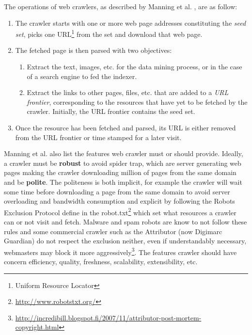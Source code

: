 \documentclass[11pt,a4paper]{article}
\begin{document}
The operations of web crawlers, as described by Manning et al. \cite[pp. 405-420]{man:info_ret}, are as follow:
\vspace{-15pt}\begin{enumerate}
\setlength{\itemsep}{0cm}%
\setlength{\parskip}{0cm}%
\item The crawler starts with one or more web page addresses constituting the \textit{seed set}, picks one URL\footnote{Uniform Resource Locator} from the set and download that web page.
\item The fetched page is then parsed with two objectives:
	\vspace{-5pt}\begin{enumerate}
	\setlength{\itemsep}{0cm}%
	\setlength{\parskip}{0cm}%
	\item Extract the text, images, etc. for the data mining process, or in the case of a search engine to fed the indexer.
	\item Extract the links to other pages, files, etc. that are added to a \textit{URL frontier}, corresponding to the resources that have yet to be fetched by the crawler. Initially, the URL frontier contains the seed set.
	\end{enumerate}\vspace{-4pt}
\item Once the resource has been fetched and parsed, its URL is either removed from the URL frontier or time stamped for a later visit.
\end{enumerate}
\vspace{-9pt}
Manning et al. \cite[pp. 405-420]{man:info_ret} also list the features web crawler must or should provide. Ideally, a crawler must be \textbf{robust} to avoid spider trap, which are server generating web pages making the crawler downloading million of pages from the same domain and be \textbf{polite}. The politeness is both implicit, for example the crawler will wait some time before downloading a page from the same domain to avoid server overloading and bandwidth consumption and explicit by following the Robots Exclusion Protocol define in the robot.txt\footnote{\url{http://www.robotstxt.org/}} which set what resources a crawler can or not visit and fetch. Malware and spam robots are know to not follow these rules and some commercial crawler such as the Attributor (now Digimarc Guardian) do not respect the exclusion neither, even if understandably necessary, webmasters may block it more aggressively\footnote{\url{http://incredibill.blogspot.fi/2007/11/attributor-post-mortem-copyright.html}}. The features crawler should have concern efficiency, quality, freshness, scalability, extensibility, etc.\\


\begin{flushleft}

\end{flushleft}
\end{document}
